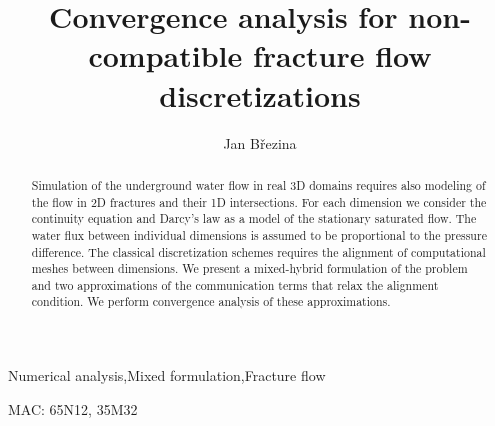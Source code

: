 \documentclass{elsarticle}
\begin{document}
\parindent=0pt

\begin{frontmatter}
 \title{Convergence analysis
 for non-compatible fracture flow discretizations}


\author[NTI]{Jan B\v rezina}

\address[NTI]{New Technologies Institute, 
Technical University in Liberec, 
Studentsk\'a 2/1402,
461 17  Liberec, 
Czech Republic
}

\begin{abstract}
Simulation of the underground water flow in real 3D domains requires also modeling of the flow in
2D fractures and their 1D intersections. For each dimension we consider  
the continuity equation and Darcy's law as a model of the stationary saturated flow.
The water flux between individual dimensions is assumed to be proportional to the pressure difference. The classical discretization schemes requires the alignment of computational meshes between dimensions. We present a mixed-hybrid formulation of the problem and two approximations of the communication terms that relax the alignment condition.
We perform convergence analysis of these approximations.
\end{abstract}

\begin{keyword}
Numerical analysis\sep Mixed formulation\sep Fracture flow 

MAC: 65N12, 35M32
\end{keyword}

\end{frontmatter}




\end{document}
